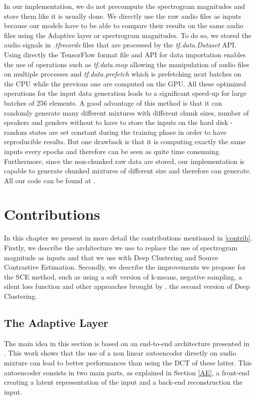 \documentclass[master,final,11pt]{iscs-thesis}
\begin{document}
In our implementation, we do not precompute the spectrogram magnitudes and store them like it is usually done. We directly use the raw audio files as inputs because our models have to be able to compare their results on the same audio files using the Adaptive layer or spectrogram magnitudes. To do so, we stored the audio signals in \textit{.tfrecords} files that are processed by the \textit{tf.data.Dataset} API. Using directly the TensorFlow format file and API for data importation enables the use of operations such as \textit{tf.data.map} allowing the manipulation of audio files on multiple processes and \textit{tf.data.prefetch} which is prefetching next batches on the CPU while the previous one are computed on the GPU.
All these optimized operations for the input data generation leads to a significant speed-up for large batches of 256 elements. A good advantage of this method is that it can randomly generate many different mixtures with different chunk sizes, number of speakers and genders without to have to store the inputs on the hard disk - random states are set constant during the training phase in order to have reproducible results. But one drawback is that it is computing exactly the same inputs every epochs and therefore can be seen as quite time consuming.
 Furthermore, since the non-chunked raw data are stored, our implementation is capable to generate chunked mixtures of different size and therefore can generate. All our code can be found at \cite{github}.

\chapter{Contributions}

In this chapter we present in more detail the contributions mentioned in \ref{contrib}. Firstly, we describe the architecture we use to replace the use of spectrogram magnitude as inputs and that we use with Deep Clustering and Source Contrastive Estimation. Secondly, we describe the improvements we propose for the SCE method, such as using a soft version of k-means, negative sampling, a silent loss function and other approaches brought by \cite{DPCLV2}, the second version of Deep Clustering.

\section{The Adaptive Layer}
\label{adapt}

The main idea in this section is based on an end-to-end architecture presented in \cite{Adaptive}. This work shows that the use of a non linear autoencoder directly on audio mixture can lead to better performances than using the DCT of these latter. This autoencoder consists in two main parts, as explained in Section \ref{AE}, a front-end creating a latent representation of the input and a back-end reconstruction the input.
\end{document}
